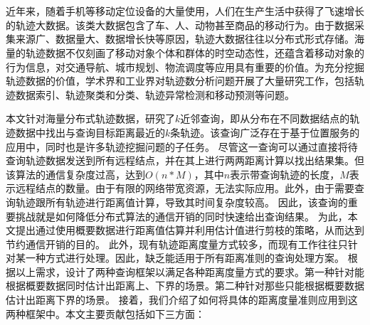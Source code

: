\chapter*{}
近年来，随着手机等移动定位设备的大量使用，人们在生产生活中获得了飞速增长的轨迹大数据。该类大数据包含了车、人、动物甚至商品的移动行为。由于数据采集来源广、数据量大、数据增长快等原因，轨迹大数据往往以分布式形式存储。海量的轨迹数据不仅刻画了移动对象个体和群体的时空动态性，还蕴含着移动对象的行为信息，对交通导航、城市规划、物流调度等应用具有重要的价值。为充分挖掘轨迹数据的价值，学术界和工业界对轨迹数分析问题开展了大量研究工作，包括轨迹数据索引、轨迹聚类和分类、轨迹异常检测和移动预测等问题。

本文针对海量分布式轨迹数据，研究了$k$近邻查询，即从分布在不同数据结点的轨迹数据中找出与查询目标距离最近的$k$条轨迹。该查询广泛存在于基于位置服务的应用中，同时也是许多轨迹挖掘问题的子任务。
尽管这一查询可以通过直接将待查询轨迹数据发送到所有远程结点，并在其上进行两两距离计算以找出结果集。但该算法的通信复杂度过高，达到$O(n*M)$，其中$n$表示带查询轨迹的长度，$M$表示远程结点的数量。由于有限的网络带宽资源，无法实际应用。此外，由于需要查询轨迹跟所有轨迹进行距离值计算，导致其时间复杂度较高。
因此，该查询的重要挑战就是如何降低分布式算法的通信开销的同时快速给出查询结果。
为此，本文提出通过使用概要数据进行距离值估算并利用估计值进行剪枝的策略，从而达到节约通信开销的目的。
此外，现有轨迹距离度量方式较多，而现有工作往往只针对某一种方式进行处理。因此，缺乏能适用于所有距离准则的查询处理方案。
根据以上需求，设计了两种查询框架以满足各种距离度量方式的要求。第一种针对能根据概要数据同时估计出距离上、下界的场景。第二种针对那些只能根据概要数据估计出距离下界的场景。
接着，我们介绍了如何将具体的距离度量准则应用到这两种框架中。本文主要贡献包括如下三方面：

